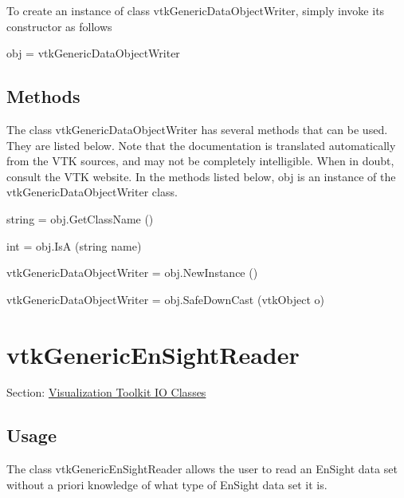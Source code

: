 To create an instance of class vtk\-Generic\-Data\-Object\-Writer, simply invoke its constructor as follows \begin{DoxyVerb}  obj = vtkGenericDataObjectWriter
\end{DoxyVerb}
 \hypertarget{vtkwidgets_vtkxyplotwidget_Methods}{}\subsection{Methods}\label{vtkwidgets_vtkxyplotwidget_Methods}
The class vtk\-Generic\-Data\-Object\-Writer has several methods that can be used. They are listed below. Note that the documentation is translated automatically from the V\-T\-K sources, and may not be completely intelligible. When in doubt, consult the V\-T\-K website. In the methods listed below, {\ttfamily obj} is an instance of the vtk\-Generic\-Data\-Object\-Writer class. 
\begin{DoxyItemize}
\item {\ttfamily string = obj.\-Get\-Class\-Name ()}  
\item {\ttfamily int = obj.\-Is\-A (string name)}  
\item {\ttfamily vtk\-Generic\-Data\-Object\-Writer = obj.\-New\-Instance ()}  
\item {\ttfamily vtk\-Generic\-Data\-Object\-Writer = obj.\-Safe\-Down\-Cast (vtk\-Object o)}  
\end{DoxyItemize}\hypertarget{vtkio_vtkgenericensightreader}{}\section{vtk\-Generic\-En\-Sight\-Reader}\label{vtkio_vtkgenericensightreader}
Section\-: \hyperlink{sec_vtkio}{Visualization Toolkit I\-O Classes} \hypertarget{vtkwidgets_vtkxyplotwidget_Usage}{}\subsection{Usage}\label{vtkwidgets_vtkxyplotwidget_Usage}
The class vtk\-Generic\-En\-Sight\-Reader allows the user to read an En\-Sight data set without a priori knowledge of what type of En\-Sight data set it is.

